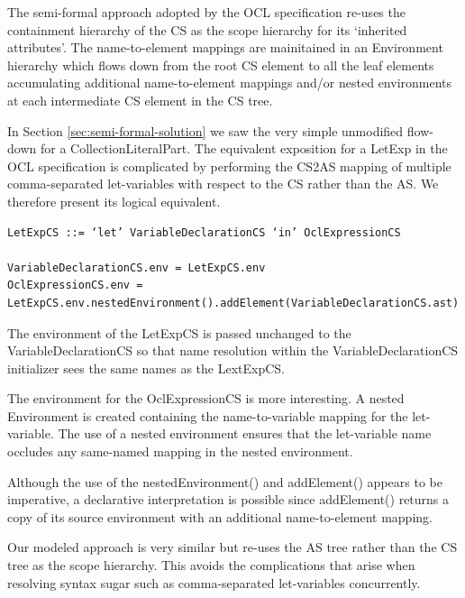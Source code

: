 \documentclass{llncs}
\begin{document}
The semi-formal approach adopted by the OCL specification re-uses the containment hierarchy of the CS as the scope hierarchy for its `inherited attributes'. The name-to-element mappings are mainitained in an Environment hierarchy which flows down from the root CS element to all the leaf elements accumulating additional name-to-element mappings and/or nested environments at each intermediate CS element in the CS tree.

In Section \ref{sec:semi-formal-solution} we saw the very simple unmodified flow-down for a CollectionLiteralPart. The equivalent exposition for a LetExp in the OCL specification is complicated by performing the CS2AS mapping of multiple comma-separated let-variables with respect to the CS rather than the AS. We therefore present its logical equivalent.

\begin{lstlisting}[caption=Semi-formal LetExpCS equivalent, label=lst:semi-formal-letexpcs, language=OCL]
LetExpCS ::= ‘let’ VariableDeclarationCS ‘in’ OclExpressionCS

VariableDeclarationCS.env = LetExpCS.env
OclExpressionCS.env = LetExpCS.env.nestedEnvironment().addElement(VariableDeclarationCS.ast)
\end{lstlisting}

The environment of the LetExpCS is passed unchanged to the VariableDeclarationCS so that name resolution within the VariableDeclarationCS initializer sees the same names as the LextExpCS.

The environment for the OclExpressionCS is more interesting. A nested Environment is created containing the name-to-variable mapping for the let-variable. The use of a nested environment ensures that the let-variable name occludes any same-named mapping in the nested environment.

Although the use of the nestedEnvironment() and addElement() appears to be imperative, a declarative interpretation is possible since addElement() returns a copy of its source environment with an additional name-to-element mapping.

Our modeled approach is very similar but re-uses the AS tree rather than the CS tree as the scope hierarchy. This avoids the complications that arise when resolving syntax sugar such as comma-separated let-variables concurrently.

\end{document}
